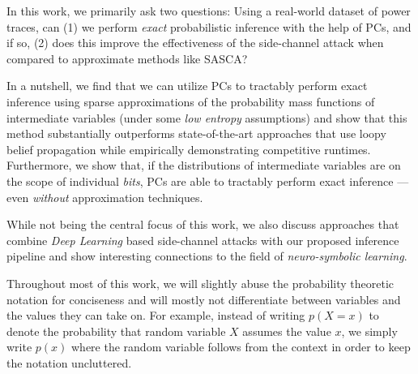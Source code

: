 In this work, we primarily ask two questions: Using a real-world dataset of power traces, can (1) we perform \textit{exact} probabilistic inference with the help of PCs, and if so, (2) does this improve the effectiveness of the side-channel attack when compared to approximate methods like SASCA?

In a nutshell, we find that we can utilize PCs to tractably perform exact inference using sparse approximations of the probability mass functions of intermediate variables (under some \emph{low entropy} assumptions) and show that this method substantially outperforms state-of-the-art approaches that use loopy belief propagation while empirically demonstrating competitive runtimes.
Furthermore, we show that, if the distributions of intermediate variables are on the scope of individual \emph{bits}, PCs are able to tractably perform exact inference --- even \emph{without} approximation techniques. 

While not being the central focus of this work, we also discuss approaches that combine \emph{Deep Learning} based side-channel attacks with our proposed inference pipeline and show interesting connections to the field of \textit{neuro-symbolic learning}.

Throughout most of this work, we will slightly abuse the probability theoretic notation for conciseness and will mostly not differentiate between variables and the values they can take on. For example, instead of writing $p(X = x)$ to denote the probability that random variable $X$ assumes the value $x$, we simply write $p(x)$ where the random variable follows from the context in order to keep the notation uncluttered. 
